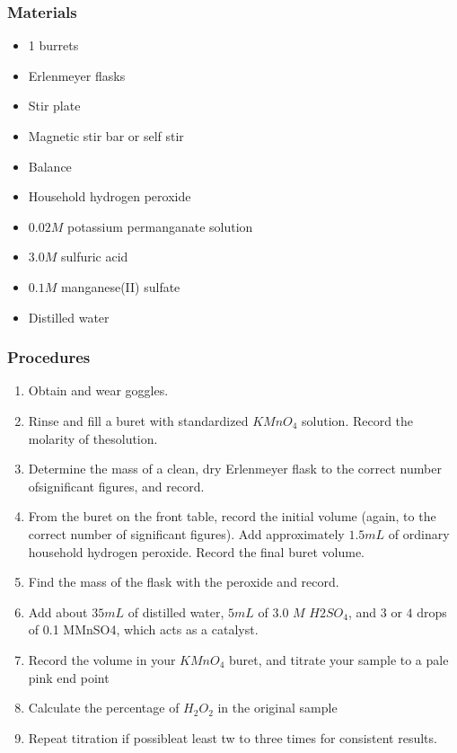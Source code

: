 \documentclass[
]{article}
\providecommand{\tightlist}{%
  \setlength{\itemsep}{0pt}\setlength{\parskip}{0pt}}
\begin{document}
\hypertarget{materials}{%
\subsubsection{Materials}\label{materials}}

\begin{itemize}
\tightlist
\item
  1 burrets
\item
  Erlenmeyer flasks
\item
  Stir plate
\item
  Magnetic stir bar or self stir
\item
  Balance
\item
  Household hydrogen peroxide
\item
  \(0.02M\) potassium permanganate solution
\item
  \(3.0M\) sulfuric acid
\item
  \(0.1M\) manganese(II) sulfate
\item
  Distilled water
\end{itemize}

\hypertarget{procedures}{%
\subsubsection{Procedures}\label{procedures}}

\begin{enumerate}
\def\labelenumi{\arabic{enumi}.}
\tightlist
\item
  Obtain and wear goggles.
\item
  Rinse and fill a buret with standardized \(KMnO_4\) solution. Record
  the molarity of thesolution.
\item
  Determine the mass of a clean, dry Erlenmeyer flask to the correct
  number ofsignificant figures, and record.
\item
  From the buret on the front table, record the initial volume (again,
  to the correct number of significant figures). Add approximately
  \(1.5 mL\) of ordinary household hydrogen peroxide. Record the final
  buret volume.
\item
  Find the mass of the flask with the peroxide and record.
\item
  Add about \(35 mL\) of distilled water, \(5 mL\) of \(3.0\) \(M\)
  \(H2SO_4\), and \(3\) or \(4\) drops of 0.1 MMnSO4, which acts as a
  catalyst.
\item
  Record the volume in your \(KMnO_4\) buret, and titrate your sample to
  a pale pink end point
\item
  Calculate the percentage of \(H_2O_2\) in the original sample
\item
  Repeat titration if possibleat least tw to three times for consistent
  results.
\end{enumerate}
\end{document}

